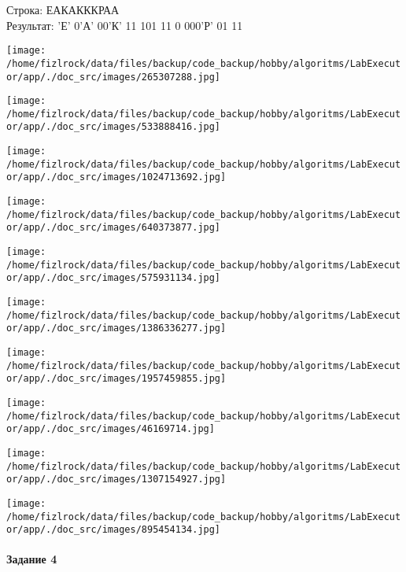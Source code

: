 \documentclass[a4paper, 12pt]{article}
\begin{document}
Строка: 
ЕАКАКККРАА\\
Результат: 'Е' 0'А' 00'К' 11 101 11 0 000'Р' 01 11

\texttt{[image: /home/fizlrock/data/files/backup/code\_backup/hobby/algoritms/LabExecutor/app/./doc\_src/images/265307288.jpg]}

\texttt{[image: /home/fizlrock/data/files/backup/code\_backup/hobby/algoritms/LabExecutor/app/./doc\_src/images/533888416.jpg]}

\texttt{[image: /home/fizlrock/data/files/backup/code\_backup/hobby/algoritms/LabExecutor/app/./doc\_src/images/1024713692.jpg]}

\texttt{[image: /home/fizlrock/data/files/backup/code\_backup/hobby/algoritms/LabExecutor/app/./doc\_src/images/640373877.jpg]}

\texttt{[image: /home/fizlrock/data/files/backup/code\_backup/hobby/algoritms/LabExecutor/app/./doc\_src/images/575931134.jpg]}

\texttt{[image: /home/fizlrock/data/files/backup/code\_backup/hobby/algoritms/LabExecutor/app/./doc\_src/images/1386336277.jpg]}

\texttt{[image: /home/fizlrock/data/files/backup/code\_backup/hobby/algoritms/LabExecutor/app/./doc\_src/images/1957459855.jpg]}

\texttt{[image: /home/fizlrock/data/files/backup/code\_backup/hobby/algoritms/LabExecutor/app/./doc\_src/images/46169714.jpg]}

\texttt{[image: /home/fizlrock/data/files/backup/code\_backup/hobby/algoritms/LabExecutor/app/./doc\_src/images/1307154927.jpg]}

\texttt{[image: /home/fizlrock/data/files/backup/code\_backup/hobby/algoritms/LabExecutor/app/./doc\_src/images/895454134.jpg]}
\pagebreak
\paragraph{Задание 4}
\end{document}
